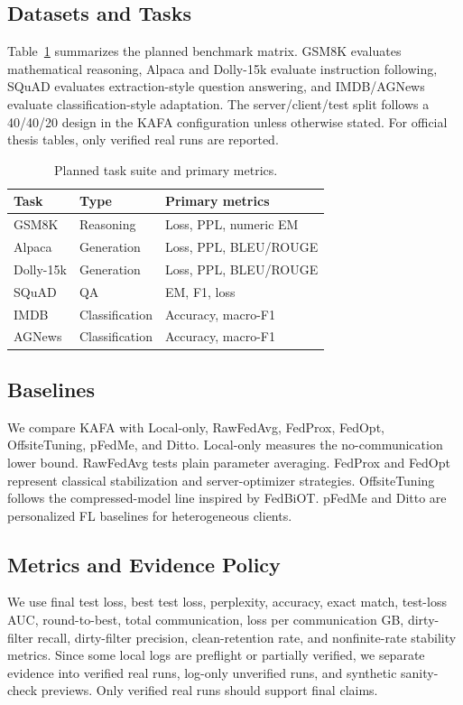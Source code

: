 \documentclass[conference]{IEEEtran}
\begin{document}
\subsection{Datasets and Tasks}
Table~\ref{tab:datasets} summarizes the planned benchmark matrix. GSM8K evaluates mathematical reasoning, Alpaca and Dolly-15k evaluate instruction following, SQuAD evaluates extraction-style question answering, and IMDB/AGNews evaluate classification-style adaptation. The server/client/test split follows a 40/40/20 design in the KAFA configuration unless otherwise stated. For official thesis tables, only verified real runs are reported.

\begin{table}[t]
\caption{Planned task suite and primary metrics.}
\label{tab:datasets}
\centering
\small
\begin{tabular}{lll}
\toprule
Task & Type & Primary metrics \\
\midrule
GSM8K & Reasoning & Loss, PPL, numeric EM \\
Alpaca & Generation & Loss, PPL, BLEU/ROUGE \\
Dolly-15k & Generation & Loss, PPL, BLEU/ROUGE \\
SQuAD & QA & EM, F1, loss \\
IMDB & Classification & Accuracy, macro-F1 \\
AGNews & Classification & Accuracy, macro-F1 \\
\bottomrule
\end{tabular}
\end{table}

\subsection{Baselines}
We compare KAFA with Local-only, RawFedAvg, FedProx, FedOpt, OffsiteTuning, pFedMe, and Ditto. Local-only measures the no-communication lower bound. RawFedAvg tests plain parameter averaging. FedProx and FedOpt represent classical stabilization and server-optimizer strategies. OffsiteTuning follows the compressed-model line inspired by FedBiOT. pFedMe and Ditto are personalized FL baselines for heterogeneous clients.

\subsection{Metrics and Evidence Policy}
We use final test loss, best test loss, perplexity, accuracy, exact match, test-loss AUC, round-to-best, total communication, loss per communication GB, dirty-filter recall, dirty-filter precision, clean-retention rate, and nonfinite-rate stability metrics. Since some local logs are preflight or partially verified, we separate evidence into verified real runs, log-only unverified runs, and synthetic sanity-check previews. Only verified real runs should support final claims.
\end{document}
